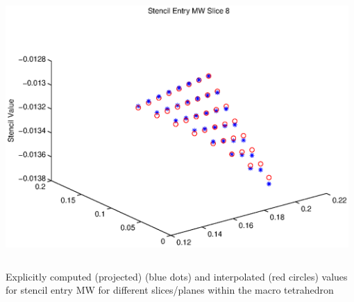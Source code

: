 \documentclass[t,compress=false,usepdftitle=false]{beamer}
\begin{document}
\begin{frame}
\begin{columns}[T]
\begin{column}[T]{4.1cm}
  \includegraphics[width=0.98\textwidth]{stencilMW_slice8}\\
\end{column}
\end{columns}
\vspace{0.5cm}
\centering
Explicitly computed (projected) (blue dots) and interpolated 
(red circles) values for stencil entry
MW for different slices/planes within the macro tetrahedron
\end{frame}

%
%
\end{document}
